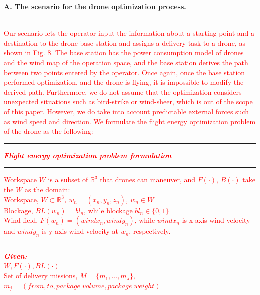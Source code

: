 \documentclass[onecolumn]{IEEEconf}
\begin{document}
\begin{description}
    \begin{mdframed}[ linewidth=.75pt, userdefinedwidth=0.9\textwidth]
    \textbf{A. The scenario for the drone optimization process.}~\\
    ~\\
    \textcolor{red}{Our scenario lets the operator input the information about a starting point and a destination to the drone base station and assigns a delivery task to a drone, as shown in Fig. 8. The base station has the power consumption model of drones and the wind map of the operation space, and the base station derives the path between two points entered by the operator. Once again, once the base station performed optimization, and the drone is flying, it is impossible to modify the derived path. Furthermore, we do not assume that the optimization considers unexpected situations such as bird-strike or wind-sheer, which is out of the scope of this paper. However, we do take into account predictable external forces such as wind speed and direction. We formulate the flight energy optimization problem of the drone as the following:
    ~\\
    \textcolor{red}{
    \vspace{7pt}
    \hrule
    \vspace{5pt}
    \noindent\textit{\textbf{Flight energy optimization problem formulation}}
    \vspace{5pt}
    \hrule
    \vspace{5pt}
    \noindent Workspace $W$ is a subset of $\mathbb{R}^3$ that drones can maneuver, and $F(\cdot)$, $B(\cdot)$ take the $W$ as the domain:\\
    \indent Workspace, \textit{$W\subset\mathbb{R}^3$, $w_n=(x_n,y_n,z_n)$, $w_n \in W$ }\\
    \indent Blockage, \textit{$BL(w_n)=bl_n$}, while blockage $bl_n\in\{0,1\}$\\
    \indent Wind field, \textit{$F(w_n) = (windx_n, windy_n)$}, while $windx_n$ is  
    x-axis wind velocity and $windy_n$ is y-axis wind velocity
    at $w_n$, respectively.
    \vspace{5pt}
    \hrule
    \vspace{5pt}
    \noindent\textit{\textbf{Given:}}~\\
    \indent $W, F(\cdot), BL(\cdot)$~\\
    \indent Set of delivery missions, $M = \{m_1, ..., m_J\},$~\\ 
    \indent $m_j = (from, to, package\;volume, package\;weight)$~\\
}}
\end{mdframed}
\end{description}
\end{document}
